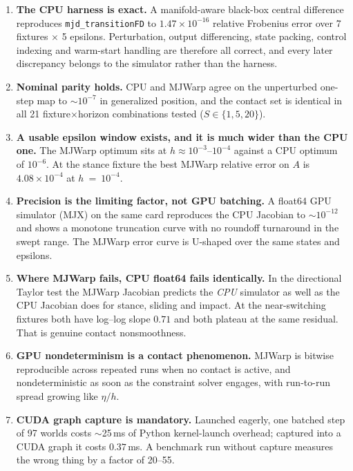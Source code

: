 \documentclass[11pt,a4paper]{article}
\newcommand{\code}[1]{\texttt{\small #1}}
\begin{document}
\begin{enumerate}\itemsep3pt

\item \textbf{The CPU harness is exact.} A manifold-aware black-box central
difference reproduces \code{mjd\_transitionFD} to $1.47\times10^{-16}$ relative Frobenius error over
7 fixtures $\times$ 5 epsilons. Perturbation, output differencing, state packing, control
indexing and warm-start handling are therefore all correct, and every later discrepancy
belongs to the simulator rather than the harness.

\item \textbf{Nominal parity holds.} CPU and MJWarp agree on the unperturbed
one-step map to $\sim$$10^{-7}$ in generalized position, and the contact set is identical
in all 21 fixture$\times$horizon combinations tested ($S \in \{1,5,20\}$).

\item \textbf{A usable epsilon window exists, and it is much wider than the CPU
one.} The MJWarp optimum sits at $h \approx 10^{-3}$--$10^{-4}$ against a CPU optimum of
$10^{-6}$. At the stance fixture the best MJWarp relative error on $A$ is
$4.08\times10^{-4}$ at $h$~=~$10^{-4}$.

\item \textbf{Precision is the limiting factor, not GPU batching.} A float64 GPU
simulator (MJX) on the same card reproduces the CPU Jacobian to $\sim$$10^{-12}$ and shows a
monotone truncation curve with no roundoff turnaround in the swept range. The MJWarp error
curve is U-shaped over the same states and epsilons.

\item \textbf{Where MJWarp fails, CPU float64 fails identically.} In the directional
Taylor test the MJWarp Jacobian predicts the \emph{CPU} simulator as well as the CPU Jacobian
does for stance, sliding and impact. At the near-switching fixtures both have log--log slope
$0.71$ and both plateau at the same residual. That is genuine contact nonsmoothness.

\item \textbf{GPU nondeterminism is a contact phenomenon.} MJWarp is bitwise
reproducible across repeated runs when no contact is active, and nondeterministic as soon as
the constraint solver engages, with run-to-run spread growing like $\eta/h$.

\item \textbf{CUDA graph capture is mandatory.} Launched eagerly, one batched step of
97 worlds costs $\sim$25\,ms of Python kernel-launch overhead; captured into a CUDA graph it
costs $0.37$\,ms. A benchmark run without capture measures the wrong thing by a factor of
20--55.


\end{enumerate}
\end{document}
